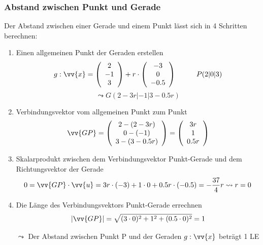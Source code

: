 \documentclass[a4paper, 15pt]{article}
\begin{document}
\subsubsection{Abstand zwischen Punkt und Gerade}
Der Abstand zwischen einer Gerade und einem Punkt lässt sich in 4 Schritten berechnen:
\begin{enumerate}
\item Einen allgemeinen Punkt der Geraden erstellen
\begin{equation*}
g:\vv{x} = \left(\begin{array}{c} 2 \\ -1 \\ 3 \end{array}\right) + r \cdot \left(\begin{array}{c} -3 \\ 0 \\ -0.5 \end{array}\right) \hspace{1cm} P(2|0|3)
\end{equation*}
\begin{equation*}
\leadsto G(2-3r|-1|3-0.5r)
\end{equation*}
\item Verbindungsvektor vom allgemeinen Punkt zum Punkt
\begin{equation*}
\vv{GP} = \left(\begin{array}{c} 2-(2-3r) \\ 0-(-1) \\ 3-(3-0.5r) \end{array}\right) = \left(\begin{array}{c} 3r \\ 1 \\ 0.5r \end{array}\right)
\end{equation*}
\item Skalarprodukt zwischen dem Verbindungsvektor Punkt-Gerade und dem Richtungsvektor der Gerade
\begin{equation*}
0 = \vv{GP} \cdot \vv{u} = 3r \cdot (-3) + 1 \cdot 0 + 0.5r \cdot (-0.5) = -\dfrac{37}{4}r \leadsto r = 0
\end{equation*}
\item Die Länge des Verbindungsvektors Punkt-Gerade errechnen
\begin{equation*}
|\vv{GP}| = \sqrt{(3 \cdot 0)^2 + 1^2 + (0.5 \cdot 0)^2} = 1
\end{equation*}
\begin{center}
$\leadsto$ Der Abstand zwischen Punkt P und der Geraden $g:\vv{x}$ beträgt 1 LE
\end{center}
\end{enumerate}
\end{document}
